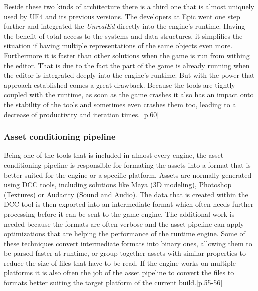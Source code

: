 \noindent 
Beside these two kinds of architecture there is a third one that is almost uniquely used by \ac{UE4} and its previous versions. The developers at Epic went one step further and integrated the \textit{UnrealEd} directly into the engine's runtime. Having the benefit of total access to the systems and data structures, it simplifies the situation if having multiple representations of the same objects even more. Furthermore it is faster than other solutions when the game is run from withing the editor. That is due to the fact the part of the game is already running when the editor is integrated deeply into the engine's runtime. But with the power that approach established comes a great drawback. Because the tools are tightly coupled with the runtime, as soon as the game crashes it also has an impact onto the stability of the tools and sometimes even crashes them too, leading to a decrease of productivity and iteration times. \cite{GEA_2}[p.60]

\subsubsection{Asset conditioning pipeline}

Being one of the tools that is included in almost every engine, the asset conditioning pipeline is responsible for formating the assets into a format that is better suited for the engine or a specific platform. Assets are normally generated using \ac{DCC} tools, including solutions like Maya (3D modeling), Photoshop (Textures) or Audacity (Sound and Audio). The data that is created within the \ac{DCC} tool is then exported into an intermediate format which often needs further processing before it can be sent to the game engine. The additional work is needed because the formats are often verbose and the asset pipeline can apply optimizations that are helping the performance of the runtime engine. Some of these techniques convert intermediate formats into binary ones, allowing them to be parsed faster at runtime, or group together assets with similar properties to reduce the size of files that have to be read. If the engine works on multiple platforms it is also often the job of the asset pipeline to convert the files to formats better suiting the target platform of the current build.\cite{GEA_2}[p.55-56]
